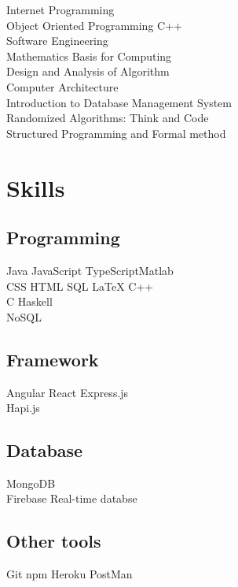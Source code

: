 \documentclass[letterpaper]{deedy-resume} %
\begin{document}
\begin{minipage}[t]{0.33\textwidth}
Internet Programming\\
Object Oriented Programming C++\\
Software Engineering\\
Mathematics Basis for Computing\\
Design and Analysis of Algorithm\\
Computer Architecture\\
Introduction to Database Management System\\
Randomized Algorithms: Think and Code\\
Structured Programming and Formal method\\




\sectionspace %


\section{Skills}

\subsection{Programming}

Java \textbullet{} JavaScript \textbullet{} TypeScript\textbullet{}Matlab \\ 
CSS \textbullet{} HTML \textbullet{} SQL \textbullet{} \LaTeX \textbullet{} C++
\\C  \textbullet{} Haskell\\
NoSQL 
\subsection{Framework}
Angular \textbullet{} React \textbullet{} Express.js \\ Hapi.js
\subsection{Database}
MongoDB \\ Firebase Real-time databse
\subsection{Other tools}
Git \textbullet{} npm \textbullet{} Heroku \textbullet{} PostMan

\sectionspace %


\end{minipage} %
\end{document}
